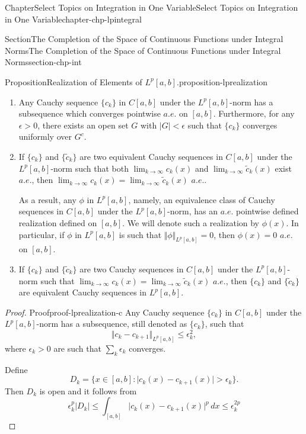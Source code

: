 \documentclass[oneside,10pt,]{book}
\numberwithin{equation}{section}
\begin{document}
\begin{chapterptx}{Chapter}{Select Topics on Integration in One Variable}{}{Select Topics on Integration in One Variable}{}{}{chapter-chp-lpintegral}
\begin{sectionptx}{Section}{The Completion of the Space of Continuous Functions under Integral Norms}{}{The Completion of the Space of Continuous Functions under Integral Norms}{}{}{section-chp-int}
\begin{proposition}{Proposition}{Realization of Elements of \(L^{p}[a, b]\).}{}{proposition-lprealization}
%
\begin{enumerate}[label=(\roman*)]
\item{}Any Cauchy sequence \(\{ c_{k}\}\) in \(C[a, b]\) under the \(L^{p}[a,  b]\)-norm has a subsequence which converges pointwise \(a.e.\) on \([a, b]\). Furthermore, for any \(\epsilon > 0\), there exists an open set \(G\) with \(|G| < \epsilon\) such that  \(\{ c_{k}\}\) converges uniformly over \(G^{c}\).%
\item{}If \(\{ c_{k}\}\) and \(\{ \tilde c_{k}\}\) are two equivalent Cauchy sequences  in \(C[a, b]\) under the \(L^{p}[a,  b]\)-norm such that both \(\lim_{k\to \infty} c_{k}(x)\) and \(\lim_{k\to \infty} \tilde c_{k}(x)\) exist \(a.e.\), then \(\lim_{k\to \infty} c_{k}(x)=\lim_{k\to \infty} \tilde c_{k}(x)\) \(a.e. \).%
\par
As a result, any \(\phi\) in \(L^{p}[a, b]\), namely, an equivalence class of Cauchy sequences in \(C[a, b]\) under the \(L^{p}[a,  b]\)-norm,  has an \(a.e.\)  pointwise defined realization defined on \([a, b]\). We will denote such a realization by \(\phi (x)\). In particular, if \(\phi\) in \(L^{p}[a, b]\) is such that \(\Vert \phi \Vert_{L^{p}[a, b]}=0\), then \(\phi(x)=0\) \(a.e.\) on \([a, b]\).%
\item{}If \(\{ c_{k}\}\) and \(\{ \tilde c_{k}\}\) are two Cauchy sequences  in \(C[a, b]\) under the \(L^{p}[a,  b]\)-norm such that \(\lim_{k\to \infty} c_{k}(x)=\lim_{k\to \infty} \tilde c_{k}(x)\) \(a.e.\), then \(\{ c_{k}\}\) and \(\{ \tilde c_{k}\}\) are equivalent Cauchy sequences in \(L^{p}[a,  b]\).%
\end{enumerate}
\end{proposition}
\begin{proof}{Proof}{}{proof-lprealization-c}
Any Cauchy sequence \(\{ c_{k}\}\) in \(C[a, b]\) under the \(L^{p}[a,  b]\)-norm has a subsequence, still denoted as \(\{ c_{k}\}\), such that%
\begin{equation*}
\Vert c_{k} -c_{k+1}\Vert_{L^{p}[a, b]}\le \epsilon_{k}^{2},
\end{equation*}
where \(\epsilon_{k} > 0\) are such that \(\sum_{k} \epsilon_{k}\) converges.%
\par
Define%
\begin{equation*}
D_{k} =\{x\in [a, b]: \vert c_{k}(x) -c_{k+1}(x)\vert > \epsilon_{k}\}.
\end{equation*}
Then \(D_{k}\) is open and it follows from%
\begin{equation*}
\epsilon_{k}^{p} |D_{k}| \le \int_{[a,b]} \vert c_{k}(x) -c_{k+1}(x)\vert^{p}\, dx \le \epsilon_{k}^{2p}

\end{equation*}
\end{proof}
\end{sectionptx}
\end{chapterptx}
\end{document}
